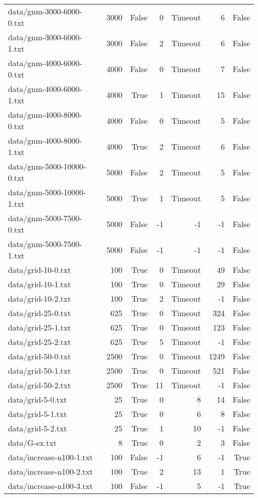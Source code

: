 \begin{tabular}{lrrrrrr}
data/gnm-3000-6000-0.txt & 3000 & False & 0 & Timeout & 6 & False \\
data/gnm-3000-6000-1.txt & 3000 & False & 2 & Timeout & 6 & False \\
data/gnm-4000-6000-0.txt & 4000 & False & 0 & Timeout & 7 & False \\
data/gnm-4000-6000-1.txt & 4000 & True & 1 & Timeout & 15 & False \\
data/gnm-4000-8000-0.txt & 4000 & False & 0 & Timeout & 5 & False \\
data/gnm-4000-8000-1.txt & 4000 & True & 2 & Timeout & 6 & False \\
data/gnm-5000-10000-0.txt & 5000 & False & 2 & Timeout & 5 & False \\
data/gnm-5000-10000-1.txt & 5000 & True & 1 & Timeout & 5 & False \\
data/gnm-5000-7500-0.txt & 5000 & False & -1 & -1 & -1 & False \\
data/gnm-5000-7500-1.txt & 5000 & False & -1 & -1 & -1 & False \\
data/grid-10-0.txt & 100 & True & 0 & Timeout & 49 & False \\
data/grid-10-1.txt & 100 & True & 0 & Timeout & 29 & False \\
data/grid-10-2.txt & 100 & True & 2 & Timeout & -1 & False \\
data/grid-25-0.txt & 625 & True & 0 & Timeout & 324 & False \\
data/grid-25-1.txt & 625 & True & 0 & Timeout & 123 & False \\
data/grid-25-2.txt & 625 & True & 5 & Timeout & -1 & False \\
data/grid-50-0.txt & 2500 & True & 0 & Timeout & 1249 & False \\
data/grid-50-1.txt & 2500 & True & 0 & Timeout & 521 & False \\
data/grid-50-2.txt & 2500 & True & 11 & Timeout & -1 & False \\
data/grid-5-0.txt & 25 & True & 0 & 8 & 14 & False \\
data/grid-5-1.txt & 25 & True & 0 & 6 & 8 & False \\
data/grid-5-2.txt & 25 & True & 1 & 10 & -1 & False \\
data/G-ex.txt & 8 & True & 0 & 2 & 3 & False \\
data/increase-n100-1.txt & 100 & False & -1 & 6 & -1 & True \\
data/increase-n100-2.txt & 100 & True & 2 & 13 & 1 & True \\
data/increase-n100-3.txt & 100 & False & -1 & 5 & -1 & True \\

\end{tabular}
